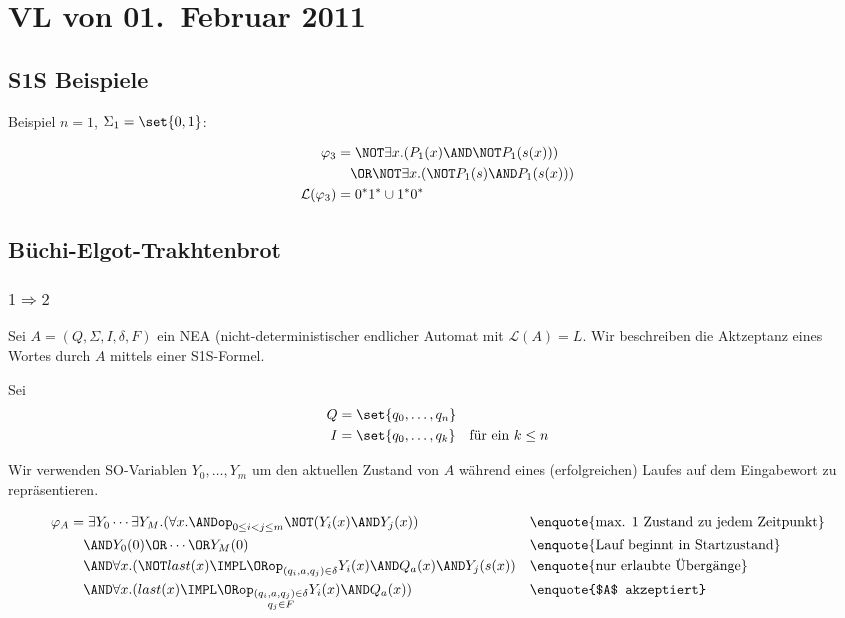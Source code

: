 \section{VL von 01.~Februar 2011}

\subsection{S1S Beispiele}

Beispiel $n=1$, $\Sigma_1=\set{0,1}$:

\begin{align*}
  \varphi_3 &= \NOT\exists x.(P_1(x)\AND\NOT P_1(s(x))) \\
    &\quad \OR \NOT\exists x.(\NOT P_1(s)\AND P_1(s(x))) \\
  \mathcal{L}(\varphi_3) &= 0^*1^* \cup 1^*0^* \\
\end{align*}

\subsection{Büchi-Elgot-Trakhtenbrot}

\subsubsection{$1\Rightarrow 2$}

Sei $A=(Q,\Sigma,I,\delta,F)$ ein NEA (nicht-deterministischer endlicher
Automat mit $\mathcal{L}(A)=L$. Wir beschreiben die Aktzeptanz eines Wortes
durch $A$ mittels einer S1S-Formel.

Sei
\begin{align*}
  Q &= \set{q_0,\dots,q_n}\\
  I &= \set{q_0,\dots,q_k} \quad\text{für ein $k\leq n$}\\
\end{align*}

Wir verwenden SO-Variablen $Y_0,\dots,Y_m$ um den aktuellen Zustand von
$A$ während eines (erfolgreichen) Laufes auf dem Eingabewort zu
repräsentieren.

\begin{align*}
  \varphi_A &= \exists Y_0 \cdots \exists Y_M.(\forall x. \ANDop_{0\leq i<j\leq m} \NOT(Y_i(x)\AND Y_j(x)) && \text{\enquote{max. 1 Zustand zu jedem Zeitpunkt}} \\
    &\quad \AND Y_0(0)\OR\cdots\OR Y_M(0) && \text{\enquote{Lauf beginnt in Startzustand}} \\
    &\quad \AND \forall x.(\NOT last(x) \IMPL \ORop_{(q_i,a,q_j)\in\delta} Y_i(x) \AND Q_a(x) \AND Y_j(s(x)) && \text{\enquote{nur erlaubte Übergänge}} \\
    &\quad \AND \forall x.(last(x)\IMPL\ORop_{\substack{(q_i,a,q_j)\in\delta\\ q_j\in F}} Y_i(x)\AND Q_a(x)) && \text{\enquote{$A$ akzeptiert}}
\end{align*}

